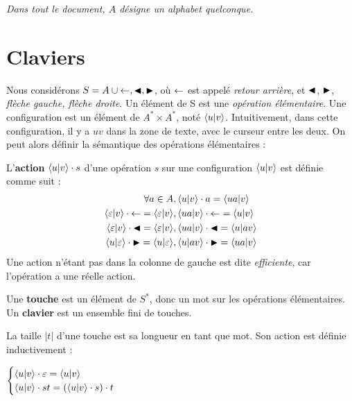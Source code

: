 \documentclass[12pt, a4paper]{article}
\begin{document}
    \emph{Dans tout le document, $A$ désigne un alphabet quelconque.}
    \section{Claviers}
    Nous considérons $S = A \cup {\mathord{\leftarrow}, \mathord{\blacktriangleleft}, \mathord{\blacktriangleright}}$, où $\mathord{\leftarrow}$ est appelé \emph{retour arrière}, et $\mathord{\blacktriangleleft}$, $\mathord{\blacktriangleright}$, \emph{flèche gauche, flèche droite}.
    Un élément de S est une \emph{opération élémentaire}.
    Une configuration est un élément de $A^* \times A^*$, noté $\left\langle u \middle| v \right\rangle$. Intuitivement, dans cette configuration, il y a $uv$ dans la zone de texte, avec le curseur entre les deux.
    On peut alors définir la sémantique des opérations élémentaires :
    \begin{semopel}
        L'\textbf{action} $\left\langle u \middle| v \right\rangle\cdot s$ d'une opération $s$ sur une configuration $\left\langle u \middle| v \right\rangle$ est définie comme suit :
        \begin{align*}
            \forall a \in A&, \left\langle u \middle| v \right\rangle\cdot a = \left\langle ua \middle| v \right\rangle \\
            \left\langle \varepsilon \middle| v \right\rangle\cdot \mathord{\leftarrow} = \left\langle \varepsilon \middle| v \right\rangle &, \left\langle ua \middle| v \right\rangle\cdot \mathord{\leftarrow} = \left\langle u \middle| v \right\rangle \\
            \left\langle \varepsilon \middle| v \right\rangle\cdot \mathord{\blacktriangleleft} = \left\langle \varepsilon \middle| v \right\rangle &, \left\langle ua \middle| v \right\rangle\cdot \mathord{\blacktriangleleft} = \left\langle u \middle| av \right\rangle \\
            \left\langle u \middle| \varepsilon \right\rangle\cdot \mathord{\blacktriangleright} = \left\langle u \middle| \varepsilon \right\rangle &, \left\langle u \middle| av \right\rangle\cdot \mathord{\blacktriangleright} = \left\langle ua \middle| v \right\rangle \\
        \end{align*}
        Une action n'étant pas dans la colonne de gauche est dite \emph{efficiente}, car l'opération a une réelle action.
    \end{semopel}
    \begin{clavier}
        Une \textbf{touche} est un élément de $S^*$, donc un mot sur les opérations élémentaires. \\
        Un \textbf{clavier} est un ensemble fini de touches.
    \end{clavier}
    La taille $|t|$ d'une touche est sa longueur en tant que mot. Son action est définie inductivement :

    $\begin{cases}
        \left\langle u \middle| v \right\rangle\cdot \varepsilon = \left\langle u \middle| v \right\rangle \\
        \left\langle u \middle| v \right\rangle\cdot st = (\left\langle u \middle| v \right\rangle\cdot s) \cdot t
    \end{cases}$
\end{document}
